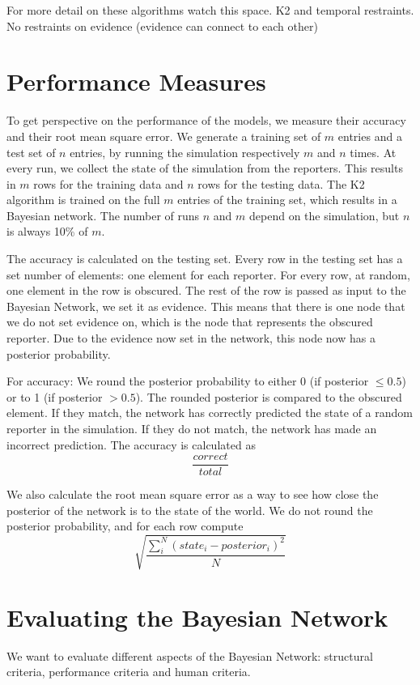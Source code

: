 For more detail on these algorithms watch this space.
K2 and temporal restraints.  No restraints on evidence (evidence can connect to each other)


\section{Performance Measures}
To get perspective on the performance of the models, we measure their accuracy and their root mean square error.
We generate a training set of $m$ entries and a test set of $n$ entries, by running the simulation respectively $m$ and $n$ times. At every run, we collect the state of the simulation from the reporters. This results in $m$ rows for the training data and $n$ rows for the testing data. The K2 algorithm is trained on the full $m$ entries of the training set, which results in a Bayesian network. The number of runs $n$ and $m$ depend on the simulation, but $n$ is always 10\% of $m$.

The accuracy is calculated on the testing set. Every row in the testing set has a set number of elements: one element for each reporter. For every row, at random, one element in the row is obscured. The rest of the row is passed as input to the Bayesian Network, we set it as evidence. This means that there is one node that we do not set evidence on, which is the node that represents the obscured reporter. Due to the evidence now set in the network, this node now has a posterior probability. 

For accuracy: We round the posterior probability to either 0 (if posterior $\leq 0.5$) or to 1 (if posterior $>0.5$). The rounded posterior is compared to the obscured element. If they match, the network has correctly predicted the state of a random reporter in the simulation. If they do not match, the network has made an incorrect prediction. The accuracy is calculated as \[\frac{correct}{total}\]

We also calculate the root mean square error as a way to see how close the posterior of the network is to the state of the world. We do not round the posterior probability, and for each row compute \[\sqrt{\frac{\sum_i^N (state_i - posterior_i)^2}{N}}\] 


\section{Evaluating the Bayesian Network}

We want to evaluate different aspects of the Bayesian Network: structural criteria, performance criteria and human criteria.

